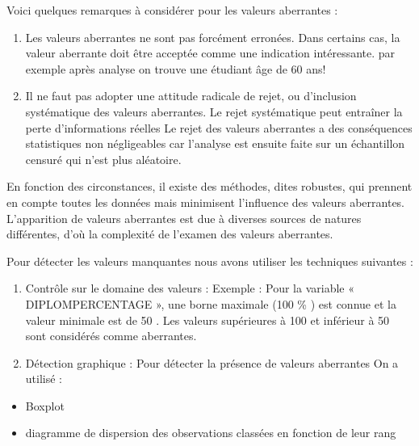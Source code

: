 Voici quelques remarques à considérer pour les valeurs aberrantes :
\begin{enumerate}
	\item Les valeurs aberrantes ne sont pas forcément erronées. Dans certains
	cas, la valeur aberrante doit être acceptée comme une indication
	intéressante. par exemple après analyse on trouve une étudiant âge de 60
	ans! 
	\item Il ne faut pas adopter une attitude radicale de rejet, ou
	d'inclusion systématique des valeurs aberrantes. Le rejet systématique
	peut entraîner la perte d'informations réelles Le rejet des valeurs
	aberrantes a des conséquences statistiques non négligeables car
	l'analyse est ensuite faite sur un échantillon censuré qui n'est plus
	aléatoire.
\end{enumerate}
En fonction des circonstances, il existe des méthodes,
dites robustes, qui prennent en compte toutes les données mais
minimisent l'influence des valeurs aberrantes. 
L'apparition de valeurs aberrantes est due à diverses sources de natures différentes, d'où la
complexité de l'examen des valeurs aberrantes.

Pour détecter les valeurs manquantes nous avons utiliser les techniques
suivantes :

\begin{enumerate}
	\def\labelenumi{\alph{enumi})}
	\item
	Contrôle sur le domaine des valeurs : Exemple : Pour la variable «
	DIPLOMPERCENTAGE », une borne maximale (100 \% ) est connue et la
	valeur minimale est de 50 . Les valeurs supérieures à 100 et
	inférieur à 50 sont considérés comme aberrantes.
	\item
	Détection graphique : Pour détecter la présence de valeurs aberrantes
	On a utilisé :
\end{enumerate}

\begin{itemize}
	\item
	Boxplot
	\item
	diagramme de dispersion des observations classées en fonction de leur
	rang
\end{itemize}

